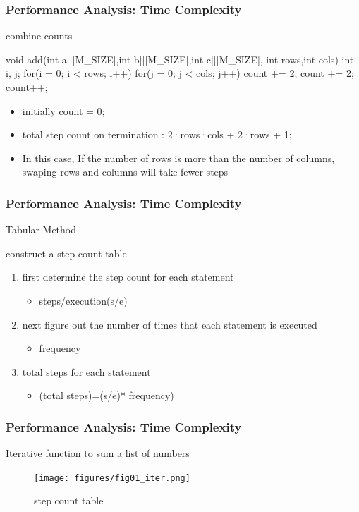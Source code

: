 \documentclass[newPxFont,sthlmFooter,nooffset]{beamer}
\begin{document}
\begin{frame}[t, fragile]
  \frametitle{Performance Analysis: Time Complexity}
combine counts
\begin{codedef}
void add(int a[][M_SIZE],int b[][M_SIZE],int c[][M_SIZE],
         int rows,int cols) {
   int i, j;
   for(i = 0; i < rows; i++) {
      for(j = 0; j < cols; j++)
         count += 2;
      count += 2; 
      }
   count++; 
}
\end{codedef}
\begin{itemize}
\item initially count = 0;
\item total step count on termination : 2·rows·cols + 2·rows + 1;
\item In this case, If the number of rows is more than the number of columns, swaping rows and columns will take fewer steps
\end{itemize}
\end{frame}


\begin{frame}[t]
  \frametitle{Performance Analysis: Time Complexity}
Tabular Method

construct a step count table
\begin{enumerate}
\item first determine the step count for each statement
  \begin{itemize}
  \item steps/execution(s/e)
  \end{itemize}

\item next figure out the number of times that
  each statement is executed
  \begin{itemize}
  \item frequency
  \end{itemize}

\item total steps for each
  statement
  \begin{itemize}
  \item (total steps)=(s/e)* frequency)
  \end{itemize}

\end{enumerate}

\end{frame}


\begin{frame}[t]
  \frametitle{Performance Analysis: Time Complexity}
Iterative function to sum a list of numbers
  \begin{figure}[h]
    \centering
    \texttt{[image: figures/fig01\_iter.png]}
    \caption{step count table}
  \end{figure}
\end{frame}
\end{document}
